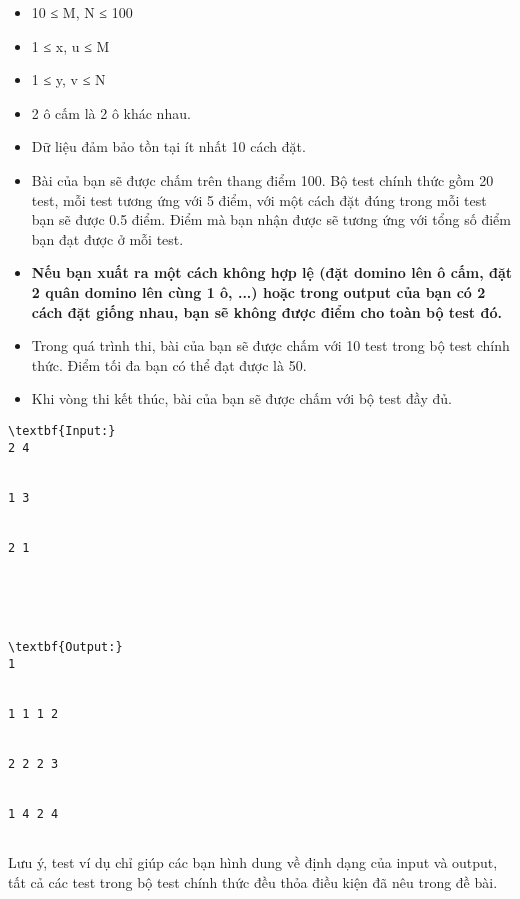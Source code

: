 \begin{itemize}
	\item     10 ≤ M, N ≤ 100   
	\item     1 ≤ x, u ≤ M   
	\item     1 ≤ y, v ≤ N   
	\item     2 ô cấm là 2 ô khác nhau.   
	\item     Dữ liệu đảm bảo tồn tại ít nhất 10 cách đặt.   
\end{itemize}
\begin{itemize}
	\item     Bài của bạn sẽ được chấm trên thang điểm 100. Bộ test chính thức gồm 20 test, mỗi test tương ứng với 5 điểm, với một cách đặt đúng trong mỗi test bạn sẽ được 0.5 điểm. Điểm mà bạn nhận được sẽ tương ứng với tổng số điểm bạn đạt được ở mỗi test.   
	\item \textbf{     Nếu bạn xuất ra một cách không hợp lệ (đặt domino lên ô cấm, đặt 2  quân domino lên cùng 1 ô, ...) hoặc trong output của bạn có 2 cách đặt  giống nhau, bạn sẽ không được điểm cho toàn bộ test đó.    }
	\item     Trong quá trình thi, bài của bạn sẽ được chấm với 10 test trong bộ test chính thức. Điểm tối đa bạn có thể đạt được là 50.   
	\item     Khi vòng thi kết thúc, bài của bạn sẽ được chấm với bộ test đầy đủ.   
\end{itemize}
\begin{itemize}
\end{itemize}
\begin{itemize}
\end{itemize}
\begin{verbatim}
\textbf{Input:}
2 4


1 3


2 1





\textbf{Output:}
1


1 1 1 2


2 2 2 3


1 4 2 4


\end{verbatim}

   Lưu ý, test ví dụ chỉ giúp các bạn hình dung về định dạng của input và output, tất cả các test trong bộ test chính thức đều thỏa điều kiện đã nêu trong đề bài.